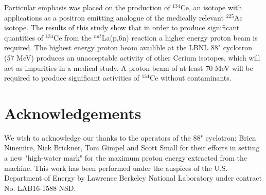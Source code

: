 \documentclass[aps,twocolumn,secnumarabic,balancelastpage,amsmath,amssymb,nofootinbib,floatfix]{revtex4-1}
\begin{document}
Particular emphasis was placed on the production of $^{134}$Ce, an isotope with applications as a positron emitting analogue of the medically relevant $^{225}$Ac isotope.  The results of this study show that in order to produce significant quantities of $^{134}$Ce from the $^{nat}$La(p,6n) reaction a higher energy proton beam is required.  The highest energy proton beam availible at the LBNL 88" cyclotron (57 MeV) produces an unacceptable activity of other Cerium isotopes, which will act as impurities in a medical study.  A proton beam of at least 70 MeV will be required to produce significant activities of $^{134}$Ce without contaminants.

\section*{Acknowledgements}
We wish to acknowledge our thanks to the operators of the 88" cyclotron: Brien Ninemire, Nick Brickner, Tom Gimpel and Scott Small for their efforts in setting a new "high-water mark" for the maximum proton energy extracted from the machine.  This work has been performed under the auspices of the U.S. Department of Energy by Lawrence Berkeley National Laboratory under contract No. LAB16-1588 NSD.



\end{document}
